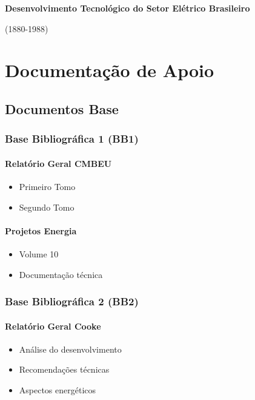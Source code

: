 \documentclass[12pt,a4paper]{report}
\begin{document}
\begin{center}
{\LARGE\textbf{Desenvolvimento Tecnológico do Setor Elétrico Brasileiro}}
\vspace{0.5cm}

{\Large (1880-1988)}
\vspace{2cm}
\end{center}

\tableofcontents
\newpage

\part{Documentação de Apoio}

\chapter{Documentos Base}
\section{Base Bibliográfica 1 (BB1)}
\subsection{Relatório Geral CMBEU}
\begin{itemize}
    \item Primeiro Tomo
    \item Segundo Tomo
\end{itemize}

\subsection{Projetos Energia}
\begin{itemize}
    \item Volume 10
    \item Documentação técnica
\end{itemize}

\section{Base Bibliográfica 2 (BB2)}
\subsection{Relatório Geral Cooke}
\begin{itemize}
    \item Análise do desenvolvimento
    \item Recomendações técnicas
    \item Aspectos energéticos
\end{itemize}
\end{document}
